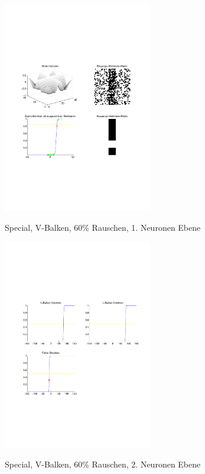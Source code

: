 \begin{figure}[hbt]
	\begin{minipage}[c]{\textwidth}
		\centering
       	\includegraphics[trim=71 213 43 212, clip, width=0.58\textwidth]{./Bilder/Auswertung/Endergebnis/TypeSpecial_Rauschen60_V_Line_Layer1}
		\caption{Special, V-Balken, 60\% Rauschen, 1. Neuronen Ebene}
		\label{Special_V_60_1}
		\vfill
		\includegraphics[trim=71 213 43 212, clip, width=0.58\textwidth]{./Bilder/Auswertung/Endergebnis/TypeSpecial_Rauschen60_V_Line_Layer2}
		\caption{Special, V-Balken, 60\% Rauschen, 2. Neuronen Ebene}
		\label{Special_V_60_2}
	\end{minipage}
\end{figure}

